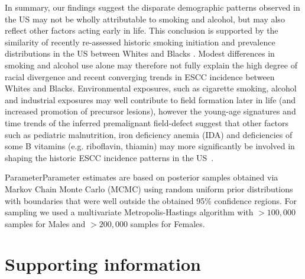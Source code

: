 \documentclass[10pt,letterpaper]{article}
\begin{document}
In summary, our findings suggest the disparate demographic patterns observed in the US may not be wholly attributable to smoking and alcohol, but may also reflect other factors acting early in life. This conclusion is supported by the similarity of recently re-assessed historic smoking initiation and prevalence distributions in the US between Whites and Blacks \cite{Holford2016}. Modest differences in smoking and alcohol use alone may therefore not fully explain the high degree of racial divergence and recent converging trends in ESCC incidence between Whites and Blacks. Environmental exposures, such as cigarette smoking, alcohol and industrial exposures may well contribute to field formation later in life (and increased promotion of precursor lesions), however the young-age signatures and time trends of the inferred premalignant field-defect suggest that other factors such as pediatric malnutrition, iron deficiency anemia (IDA) and deficiencies of some B vitamins (e.g. riboflavin, thiamin) may more significantly be involved in shaping the historic ESCC incidence patterns in the US~\cite{Taylor2013,Abnet2018}. 


\newpage
\noindent
ParameterParameter estimates are based on posterior samples obtained via Markov Chain Monte Carlo (MCMC) using random uniform prior distributions with boundaries that were well outside the obtained 95\% confidence regions. For sampling we used a multivariate Metropolis-Hastings algorithm with $>100,000$ samples for Males and $>200,000$ samples for Females. 


\newpage

\section*{Supporting information}

\end{document}
